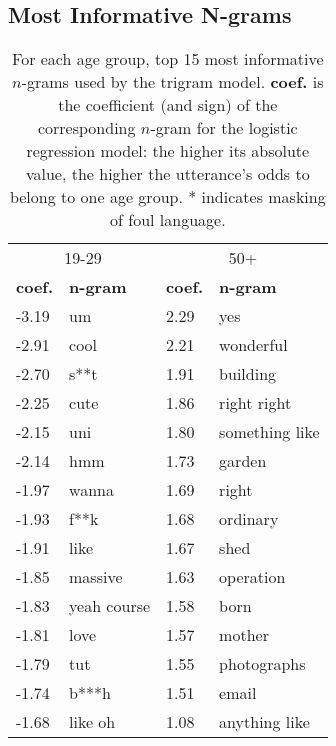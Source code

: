 \subsection{Most Informative N-grams}



\begin{table}[b!]
    \centering
    \begin{tabular}{@{}l l @{\hspace*{25pt}} l l@{}}
    \toprule
    \multicolumn{2}{c}{19-29} & \multicolumn{2}{c}{50+}\\
    \textbf{coef.} & \textbf{n-gram} & \textbf{coef.} & \textbf{n-gram}\\
    \midrule
    -3.19 & um & 2.29 & yes\\
    -2.91 & cool & 2.21 & wonderful\\
    -2.70 & s**t & 1.91 & building\\
    -2.25 & cute & 1.86 & right right\\
    -2.15 & uni & 1.80 & something like\\
    -2.14 & hmm & 1.73 & garden\\
    -1.97 & wanna & 1.69 & right\\
    -1.93 & f**k & 1.68 & ordinary\\
    -1.91 & like & 1.67 & shed\\
    -1.85 & massive & 1.63 & operation\\
    -1.83 & yeah course & 1.58 & born\\
    -1.81 & love & 1.57 & mother\\
    -1.79 & tut & 1.55 & photographs\\
    -1.74 & b***h & 1.51 & email\\
    -1.68 & like oh & 1.08 & anything like\\
    \bottomrule
    \end{tabular}
    \caption{For each age group, top 15 most informative $n$-grams used by the trigram model. \textbf{coef.} is the coefficient (and sign) of the corresponding $n$-gram for the logistic regression model: the higher its absolute value, the higher the utterance's odds to belong to one age group.
    * indicates masking of foul language.}
    \label{tab:top_ngrams}
\end{table}


